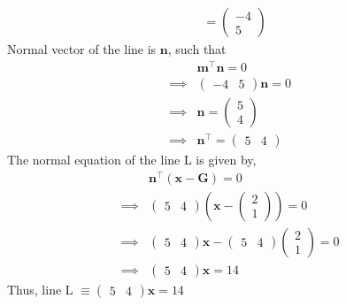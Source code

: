 \documentclass[journal,12pt,twocolumn]{IEEEtran}
\let\vec\mathbf
\providecommand{\brak}[1]{\ensuremath{\left(#1\right)}}
\newcommand{\myvec}[1]{\ensuremath{\begin{pmatrix}#1\end{pmatrix}}}
\begin{document}
\begin{enumerate}
\begin{align}
	\\
	&= \myvec{-4 \\ 5}
    \end{align}
    Normal vector of the line is $\vec{n}$, such that
    \begin{align}
	&\vec{m}^{\top}\vec{n} = 0
	\\
	\implies &\myvec{-4 & 5}\vec{n} = 0
	\\
	\implies &\vec{n} = \myvec{5 \\ 4}
	\\
	\implies &\vec{n}^{\top} = \myvec{5 & 4}
    \end{align}
    The normal equation of the line L is given by, 
    \begin{align}
	&\vec{n}^{\top}\brak{\vec{x} - \vec{G}} = 0
	\\
	\implies &\myvec{5 & 4}\brak{\vec{x} - \myvec{2 \\ 1}} = 0
	\\
	\implies &\myvec{5 & 4}\vec{x} - \myvec{5 & 4}\myvec{2 \\ 1} = 0
	\\
	\implies &\myvec{5 & 4}\vec{x} = 14
    \end{align}
    Thus, line L $\equiv \myvec{5 & 4}\vec{x} = 14$
\end{enumerate}
\end{document}
